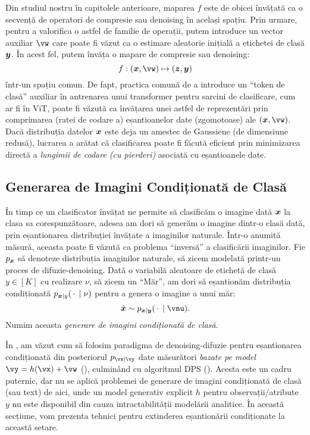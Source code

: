 \documentclass[../../book-main_ro.tex]{subfiles}
\begin{document}
Din studiul nostru în capitolele anterioare, maparea $f$ este de obicei învățată ca o secvență de operatori de compresie sau denoising în același spațiu. Prin urmare, pentru a valorifica o astfel de familie de operații, putem introduce un vector auxiliar $\vw$ care poate fi văzut ca o estimare aleatorie inițială a etichetei de clasă $\bm{y}$. În acest fel, putem învăța o mapare de compresie sau denoising:
\begin{equation}\label{eq:classifier-with-class-token}
    f: (\x, \vw) \mapsto (\z, \y)
\end{equation}
într-un spațiu comun. De fapt, practica comună de a introduce un ``token de clasă'' auxiliar în antrenarea unui transformer pentru sarcini de clasificare, cum ar fi în ViT, poate fi văzută ca învățarea unei astfel de reprezentări prin comprimarea (ratei de codare a) eșantioanelor date (zgomotoase) ale $(\x, \vw)$. Dacă distribuția datelor $\bm{x}$ este deja un amestec de Gaussiene (de dimensiune redusă), lucrarea \cite{wright2008classification} a arătat că clasificarea poate fi făcută eficient prin minimizarea directă a {\em lungimii de codare (cu pierderi)} asociată cu eșantioanele date.


\subsection{Generarea de Imagini Condiționată de Clasă}\label{sub:cfg} 
În timp ce un clasificator învățat ne permite să clasificăm o imagine dată $\bm{x}$ la
clasa sa corespunzătoare, adesea am dori să generăm o imagine dintr-o clasă dată, prin
eșantionarea distribuției învățate a imaginilor naturale. Într-o anumită măsură, aceasta poate fi
văzută ca problema ``inversă'' a clasificării imaginilor. Fie $p_{\bm{x}}$ să denoteze
distribuția imaginilor naturale, să zicem modelată printr-un proces de
difuzie-denoising. Dată o variabilă aleatoare de etichetă de clasă $y \in [K]$ cu realizare $\nu$, să zicem
un ``Măr'', am dori să eșantionăm distribuția condiționată $p_{\bm{x} \mid
y}(\,\cdot\, \mid \nu)$ pentru a genera o imagine a unui măr:
\begin{equation}
  \hat{\x} \sim p_{\x\mid \y}(\,\cdot\, \mid \vnu).
\end{equation}
Numim aceasta {\em generare de imagini condiționată de clasă}.

În , am văzut cum să folosim paradigma de denoising-difuzie pentru
eșantionarea condiționată din posteriorul $p_{\vx \mid \vy}$ date
măsurători \textit{bazate pe model} $\vy = h(\vx) + \vw$
(), culminând cu
algoritmul DPS (). Acesta este un cadru puternic,
dar nu se aplică problemei de generare de imagini condiționată de clasă (sau text)
de aici, unde un model generativ explicit $h$ pentru
observații/atribute $y$ nu este disponibil din cauza
intractabilității modelării analitice. În această secțiune, vom prezenta tehnici pentru extinderea
eșantionării condiționate la această setare.
\end{document}
